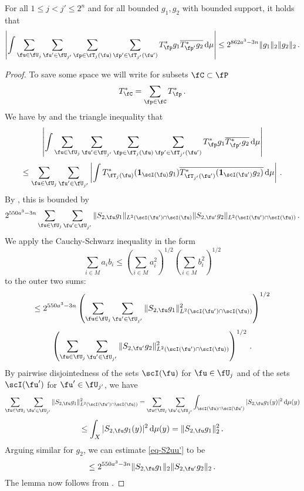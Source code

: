 \begin{lemma}
    \label{row-correlation}
    For all $1 \le j < j' \le 2^n$ and for all bounded $g_1, g_2$ with bounded support, it holds that
    $$
        \left| \int \sum_{\fu \in \fU_j} \sum_{\fu' \in \fU_{j'}} \sum_{\fp \in \fT_j(\fu)} \sum_{\fp' \in \fT_{j'}(\fu')} T^*_{\fp} g_1 \overline{T^*_{\fp'} g_2} \, \mathrm{d}\mu \right| \le
        2^{862a^3-3n}\|g_1\|_2 \|g_2\|_2\,.
    $$
\end{lemma}

\begin{proof}
    To save some space we will write for subsets $\fC \subset \fP$
    $$
        T_{\fC}^* = \sum_{\fp \in \fC} T_{\fp}^*\,.
    $$
    We have by  and the triangle inequality that
    $$
        \left| \int \sum_{\fu \in \fU_j} \sum_{\fu' \in \fU_{j'}} \sum_{\fp \in \fT_j(\fu)} \sum_{\fp' \in \fT_{j'}(\fu')} T^*_{\fp} g_1 \overline{T^*_{\fp'} g_2} \, \mathrm{d}\mu \right|
    $$
    $$
        \le \sum_{\fu \in \fU_j} \sum_{\fu' \in \fU_{j'}} \left| \int T^*_{\fT_j(\fu)} (\mathbf{1}_{\scI(\fu)} g_1) \overline{T^*_{\fT_{j'}(\fu')} (\mathbf{1}_{\scI(\fu')} g_2)} \, \mathrm{d}\mu \right|\,.
    $$
    By , this is bounded by
    \begin{equation}
        \label{eq-S2uu'}
         2^{550a^3-3n} \sum_{\fu \in \fU_j} \sum_{\fu' \in \fU_{j'}} \|S_{2,\fu} g_1\|_{L^2(\scI(\fu')\cap \scI(\fu)} \|S_{2, \fu'} g_2\|_{L^2(\scI(\fu')\cap\scI(\fu))}\,.
    \end{equation}
    We apply the Cauchy-Schwarz inequality in the form
    \begin{equation*}
        \sum_{i \in M} a_i b_i \le (\sum_{i \in M} a_i^2 )^{1/2}(\sum_{i \in M} b_i^2 )^{1/2}
    \end{equation*} to the outer two sums:
    $$
        \le 2^{550a^3-3n} \left(\sum_{\fu \in \fU_j} \sum_{\fu' \in \fU_{j'}} \|S_{2,\fu} g_1\|_{L^2(\scI(\fu')\cap \scI(\fu))}^2 \right)^{1/2}
    $$
    $$
        \left(\sum_{\fu \in \fU_j} \sum_{\fu' \in \fU_{j'}} \|S_{2,\fu'} g_2\|_{L^2(\scI(\fu')\cap\scI(\fu))}^2 \right)^{1/2}\,.
    $$
    By pairwise disjointedness of the sets $\scI(\fu)$ for $\fu \in \fU_j$ and of the sets $\scI(\fu')$ for $\fu' \in \fU_{j'}$, we have
    $$
        \sum_{\fu \in \fU_j}\sum_{\fu' \in \fU_{j'}} \|S_{2,\fu} g_1\|_{L^2(\scI(\fu')\cap \scI(\fu))}^2
        = \sum_{\fu \in \fU_j}\sum_{\fu' \in \fU_{j'}} \int_{\scI(\fu) \cap \scI(\fu')} |S_{2,\fu} g_1(y)|^2 \, \mathrm{d}\mu(y)
    $$
    $$
        \le \int_X |S_{2,\fu}g_1(y)|^2 \, \mathrm{d}\mu(y) = \|S_{2,\fu} g_1\|_2^2\,.
    $$
    Arguing similar for $g_2$, we can estimate \eqref{eq-S2uu'} to be
    $$
        \le 2^{550a^3-3n} \|S_{2,\fu}g_1\|_2 \|S_{2,\fu'} g_2\|_2\,.
    $$
    The lemma now follows from .
\end{proof}

